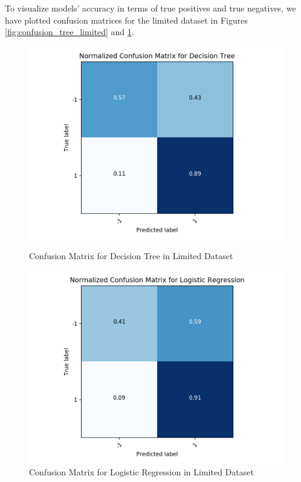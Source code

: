 \documentclass[12pt,twocolumn]{article}
\begin{document}
To visualize models' accuracy in terms of true positives and true negatives, we have plotted confusion matrices for the limited dataset in Figures \ref{fig:confusion_tree_limited} and \ref{fig:logreg_limited}. %

\begin{figure}
\centering
\begin{minipage}{0.48\linewidth}

\includegraphics[width=\linewidth]{confusion_tree_limited}
\caption{Confusion Matrix for Decision Tree in Limited Dataset}
\label{fig:confusion_tree_limited}
\end{minipage}\hfill
\begin{minipage}{0.48\linewidth}

\includegraphics[width=\linewidth]{logreg_limited}
\caption{Confusion Matrix for Logistic Regression in Limited Dataset}
\label{fig:logreg_limited}
 \end{minipage}
\end{figure}
\end{document}
